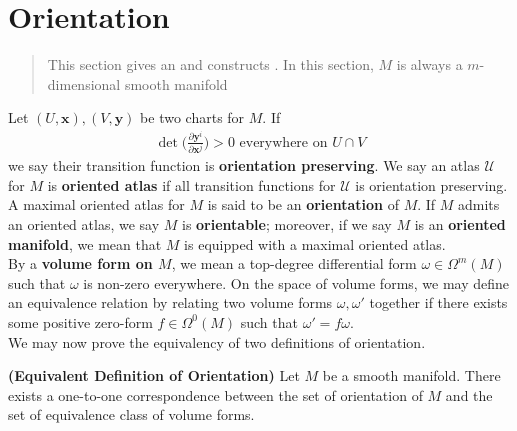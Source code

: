 \documentclass{report}
\begin{document}
\section{Orientation}
\begin{abstract}
  This section gives an  and constructs . In this section, $M$ is always a $m$-dimensional smooth manifold  
\end{abstract}
\begin{mdframed}
Let $(U,\textbf{x}),(V,\textbf{y})$ be two charts for $M$. If 
\begin{align*}
  \operatorname{det} \Big(\frac{\partial \textbf{y}^i}{\partial \textbf{x}^j} \Big)>0\text{ everywhere on }U \cap V
\end{align*}
we say their transition function is \textbf{orientation preserving}. We say an atlas $\mathcal{U}$ for  $M$ is  \textbf{oriented atlas} if all transition functions for $\mathcal{U}$ is orientation preserving. A maximal oriented atlas for $M$ is said to be an  \textbf{orientation} of $M$. If $M$ admits an oriented atlas, we say  $M$ is  \textbf{orientable}; moreover, if we say $M$ is an  \textbf{oriented manifold}, we mean that $M$ is equipped with a maximal oriented atlas.\\

By a \textbf{volume form on $M$}, we mean a top-degree differential form $\omega \in \Omega^m(M)$ such that $\omega$ is non-zero everywhere. On the space of volume forms, we may define an equivalence relation by relating two volume forms $\omega,\omega'$ together if there exists some positive zero-form $f\in \Omega^0(M)$ such that  $\omega'=f \omega$.\\


We may now prove the equivalency of two definitions of orientation.  
\end{mdframed}
\begin{theorem}
\label{EDO}
\textbf{(Equivalent Definition of Orientation)} Let $M$ be a smooth manifold. There exists a one-to-one correspondence between the set of orientation of $M$ and the set of equivalence class of volume forms. 
\end{theorem}
\end{document}
